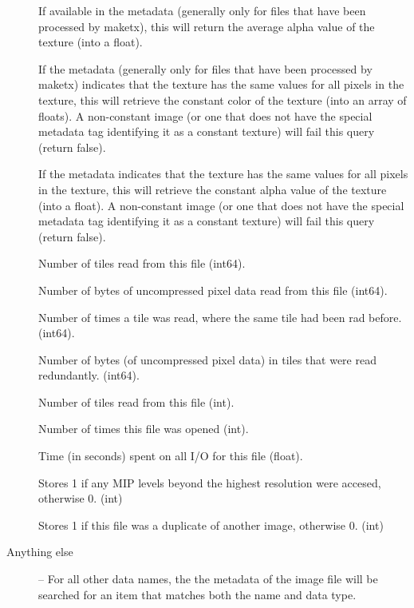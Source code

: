 \begin{description}
\item[\rm {}] If available in the metadata (generally only
for files that have been processed by {\cf maketx}), this will return the
average alpha value of the texture (into a float).

\item[\rm {}] If the metadata (generally only for files that
have been processed by {\cf maketx}) indicates that the texture has the same
values for all pixels in the texture, this will retrieve the constant color
of the texture (into an array of floats). A non-constant image (or one that
does not have the special metadata tag identifying it as a constant texture)
will fail this query (return false).

\item[\rm {}] If the metadata indicates that the texture has
the same values for all pixels in the texture, this will retrieve the
constant alpha value of the texture (into a float). A non-constant image (or
one that does not have the special metadata tag identifying it as a constant
texture) will fail this query (return false).

\item[\rm {}] Number of tiles read from this file ({\cf int64}).

\item[\rm {}] Number of bytes of uncompressed pixel data read
from this file ({\cf int64}).

\item[\rm {}] Number of times a tile was read, where
the same tile had been rad before. ({\cf int64}).

\item[\rm {}] Number of bytes (of uncompressed pixel
data) in tiles that were read redundantly. ({\cf int64}).

\item[\rm {}] Number of tiles read from this file ({\cf int}).

\item[\rm {}] Number of times this file was opened ({\cf int}).

\item[\rm {}] Time (in seconds) spent on all I/O for this file ({\cf float}).

\item[\rm {}] Stores 1 if any MIP levels beyond the highest
resolution were accesed, otherwise 0. ({\cf int})

\item[\rm {}] Stores 1 if this file was a duplicate of
another image, otherwise 0. ({\cf int})

\item[Anything else] -- For all other data names, the
the metadata of the image file will be searched for an item that
matches both the name and data type.

\end{description}
\apiend

